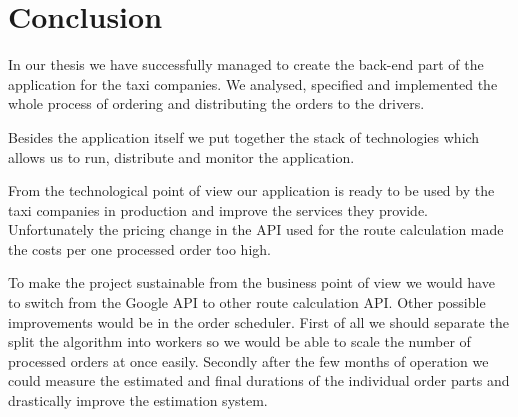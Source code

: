 \chapter*{Conclusion}
In our thesis we have successfully managed to create the back-end part of the application for the taxi companies. We analysed, specified and implemented the whole process of ordering and distributing the orders to the drivers. 

Besides the application itself we put together the stack of technologies which allows us to run, distribute and monitor the application.

From the technological point of view our application is ready to be used by the taxi companies in production and improve the services they provide. Unfortunately the pricing change in the API used for the route calculation made the costs per one processed order too high.

To make the project sustainable from the business point of view we would have to switch from the Google API to other route calculation API. Other possible improvements would be in the order scheduler. First of all we should separate the split the algorithm into workers so we would be able to scale the number of processed orders at once easily. Secondly after the few months of operation we could measure the estimated and final durations of the individual order parts and drastically improve the estimation system.